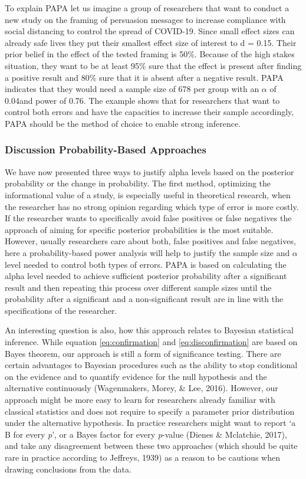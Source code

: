 \documentclass[
  english,
  ,jou,floatsintext]{apa6}
\begin{document}
To explain PAPA let us imagine a group of researchers that want to conduct a new study on the framing of persuasion messages to increase compliance with social distancing to control the spread of COVID-19. Since small effect sizes can already safe lives they put their smallest effect size of interest to d = 0.15. Their prior belief in the effect of the tested framing is 50\%. Because of the high stakes situation, they want to be at least 95\% sure that the effect is present after finding a positive result and 80\% sure that it is absent after a negative result.
PAPA indicates that they would need a sample size of 678 per group with an \(\alpha\) of 0.04and power of 0.76.
The example shows that for researchers that want to control both errors and have the capacities to increase their sample accordingly, PAPA should be the method of choice to enable strong inference.

\hypertarget{discussion-probability-based-approaches}{%
\subsubsection{Discussion Probability-Based Approaches}\label{discussion-probability-based-approaches}}

We have now presented three ways to justify alpha levels based on the posterior probability or the change in probability. The first method, optimizing the informational value of a study, is especially useful in theoretical research, when the researcher has no strong opinion regarding which type of error is more costly. If the researcher wants to specifically avoid false positives or false negatives the approach of aiming for specific posterior probabilities is the most suitable. However, usually researchers care about both, false positives and false negatives, here a probability-based power analysis will help to justify the sample size and \(\alpha\) level needed to control both types of errors. PAPA is based on calculating the alpha level needed to achieve sufficient posterior probability after a significant result and then repeating this process over different sample sizes until the probability after a significant and a non-significant result are in line with the specifications of the researcher.

An interesting question is also, how this approach relates to Bayesian statistical inference. While equation \ref{eq:confirmation} and \ref{eq:disconfirmation} are based on Bayes theorem, our approach is still a form of significance testing. There are certain advantages to Bayesian procedures such as the ability to stop conditional on the evidence and to quantify evidence for the null hypothesis and the alternative continuously (Wagenmakers, Morey, \& Lee, 2016). However, our approach might be more easy to learn for researchers already familiar with classical statistics and does not require to specify a parameter prior distribution under the alternative hypothesis. In practice researchers might want to report `a B for every \emph{p}', or a Bayes factor for every \emph{p}-value (Dienes \& Mclatchie, 2017), and take any disagreement between these two approaches (which should be quite rare in practice according to Jeffreys, 1939) as a reason to be cautious when drawing conclusions from the data.
\end{document}
